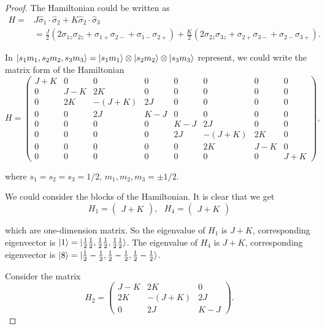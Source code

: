 \documentclass[reqno,a4paper,12pt]{amsart}
\begin{document}
\begin{enumerate}[1.]
\begin{proof}
The Hamiltonian could be written as 
\begin{align*}
	H =& J\hat{\sigma}_1 \cdot \hat{\sigma}_2 + K \hat{\sigma}_2 \cdot \hat{\sigma}_3 \\
	&= \frac{J}{2}(2\sigma_{1z}\sigma_{2z} + \sigma_{1+}\sigma_{2-} + \sigma_{1-}\sigma_{2+}) + \frac{K}{2}(2\sigma_{2z}\sigma_{3z} + \sigma_{2+}\sigma_{3-} + \sigma_{2-}\sigma_{3+}).
\end{align*}

In $\ket{s_1m_1, s_2m_2, s_3m_3} = \ket{s_1m_1} \otimes \ket{s_2m_2} \otimes \ket{s_3m_3}$ represent, we could write the matrix form of the Hamiltonian 
\[
	H = \left( \begin{matrix}
		J+K & 0 & 0 & 0 & 0 & 0 & 0 & 0 \\
		0 & J-K & 2K & 0 & 0 & 0 & 0 & 0 \\
		0 & 2K & -(J+K) & 2J & 0 & 0 & 0 & 0 \\
		0 & 0 & 2J & K-J & 0 & 0 & 0 & 0 \\
		0 & 0 & 0 & 0 & K-J & 2J & 0 & 0 \\
		0 & 0 & 0 & 0 & 2J & -(J+K) & 2K & 0 \\
		0 & 0 & 0 & 0 & 0 & 2K & J-K & 0 \\
		0 & 0 & 0 & 0 & 0 & 0 & 0 & J+K
	\end{matrix} \right),
\]

where $s_1=s_2=s_3=1/2$, $m_1,m_2,m_3 = \pm 1/2$.

We could consider the blocks of the Hamiltonian. It is clear that we get 
\[
	H_1 = \left( \begin{matrix}
		J+K
	\end{matrix} \right), \ \ \ 
	H_4 = \left( \begin{matrix}
		J+K
	\end{matrix} \right)
\]

which are one-dimension matrix. So the eigenvalue of $H_1$ is $J+K$, corresponding eigenvector is $\ket{1} = \ket{\frac{1}{2}\frac{1}{2},\frac{1}{2}\frac{1}{2},\frac{1}{2}\frac{1}{2}}$. The eigenvalue of $H_4$ is $J+K$, corresponding eigenvector is $\ket{8} = \ket{\frac{1}{2}-\frac{1}{2},\frac{1}{2}-\frac{1}{2},\frac{1}{2}-\frac{1}{2}}$.

Consider the matrix 
\[
	H_2 = \left( \begin{matrix}
		J-K & 2K & 0 \\
		2K & -(J+K) & 2J \\
		0 & 2J & K-J
	\end{matrix} \right).
\]


\end{proof}
\end{enumerate}
\end{document}
